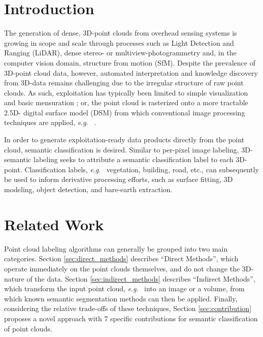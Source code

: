 \documentclass[final,3p,times,twocolumn,authoryear]{elsarticle}
\newcommand{\eg}{\textit{e}.\textit{g}.}
\begin{document}
\section{Introduction}
\label{sec:introduction}
The generation of dense, 3D-point clouds from overhead sensing systems is growing in scope and scale through processes such as Light Detection and Ranging (LiDAR), dense stereo- or multiview-photogrammetry and, in the computer vision domain, structure from motion (SfM). 
Despite the prevalence of 3D-point cloud data, however, automated interpretation and knowledge discovery from 3D-data remains challenging due to the irregular structure of raw point clouds. 
As such, exploitation has typically been limited to simple visualization and basic mensuration \citep{hackel2016fast}; or, the point cloud is rasterized onto a more tractable 2.5D- digital surface model (DSM) from which conventional image processing techniques are applied, \eg~ \citep{hug1997detecting, haala19983d}. 

In order to generate exploitation-ready data products directly from the point cloud, semantic classification is desired.
Similar to per-pixel image labeling, 3D-semantic labeling seeks to attribute a semantic classification label to each 3D-point. 
Classification labels, \eg~ vegetation, building, road, etc., can subsequently be used to inform derivative processing efforts, such as surface fitting, 3D modeling, object detection, and bare-earth extraction. 

\section{Related Work}
\label{sec:related_work}
Point cloud labeling algorithms can generally be grouped into two main categories. 
Section \ref{sec:direct_methods} describes ``Direct Methods'', which operate immediately on the point clouds themselves, and do not change the 3D-nature of the data. 
Section \ref{sec:indirect_methods} describes ``Indirect Methods'', which transform the input point cloud, \eg~ into an image or a volume, from which known semantic segmentation methods can then be applied. 
Finally, considering the relative trade-offs of these techniques, Section \ref{sec:contribution} proposes a novel approach with 7 specific contributions for semantic classification of point clouds. 
\end{document}
